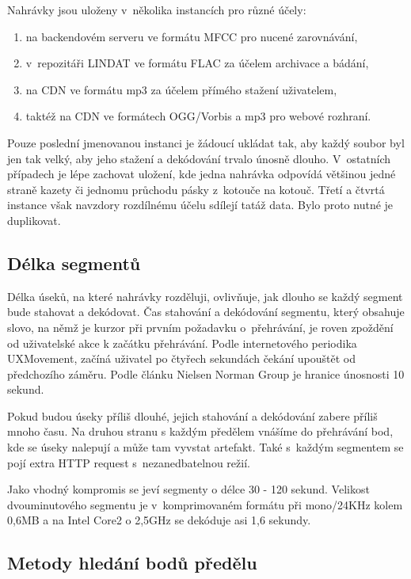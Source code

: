 Nahrávky jsou uloženy v~několika instancích pro různé účely:

\begin{enumerate}
\item{na backendovém serveru ve formátu MFCC pro nucené zarovnávání,}
\item{v~repozitáři LINDAT ve formátu FLAC za účelem archivace a bádání,}
\item{na CDN ve formátu mp3 za účelem přímého stažení uživatelem,}
\item{taktéž na CDN ve formátech OGG/Vorbis a mp3 pro webové rozhraní.}
\end{enumerate}

Pouze poslední jmenovanou instanci je žádoucí ukládat tak, aby každý soubor byl
jen tak velký, aby jeho stažení a dekódování trvalo únosně dlouho. V~ostatních
případech je lépe zachovat uložení, kde jedna nahrávka odpovídá většinou
jedné straně kazety či jednomu průchodu pásky z~kotouče na kotouč. Třetí a čtvrtá
instance však navzdory rozdílnému účelu sdílejí tatáž data. Bylo proto nutné je
duplikovat.

\subsection{Délka segmentů}

Délka úseků, na které nahrávky rozděluji, ovlivňuje, jak dlouho se každý segment
bude stahovat a dekódovat.  Čas stahování a dekódování segmentu, který obsahuje
slovo, na němž je kurzor při prvním požadavku o~přehrávání, je roven zpoždění od
uživatelské akce k začátku přehrávání. Podle internetového periodika
UXMovement\cite{foursecondrule}, začíná uživatel po čtyřech sekundách čekání
upouštět od předchozího záměru. Podle článku Nielsen Norman
Group\cite{websiteresponsetimes} je hranice únosnosti 10 sekund.

Pokud budou úseky příliš dlouhé, jejich stahování a dekódování zabere příliš
mnoho času. Na druhou stranu s každým předělem vnášíme do přehrávání bod, kde se
úseky nalepují a může tam vyvstat artefakt. Také s~každým segmentem se pojí
extra HTTP request s~nezanedbatelnou režií.

Jako vhodný kompromis se jeví segmenty o délce 30 - 120 sekund. Velikost
dvouminutového segmentu je v~komprimovaném formátu při mono/24KHz kolem 0,6MB a
na Intel Core2 o 2,5GHz se dekóduje asi 1,6 sekundy.

\subsection{Metody hledání bodů předělu}

